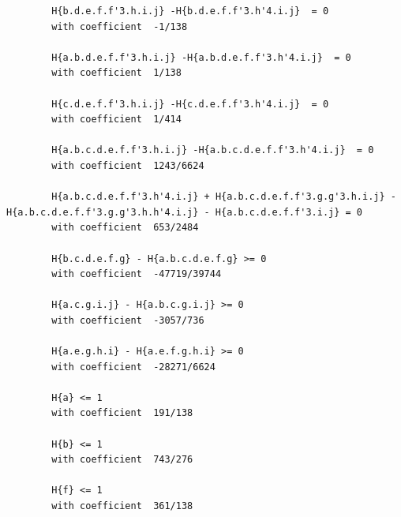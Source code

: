 \documentclass[11pt, a4paper]{kybernetika}
\begin{document}
\begin{verbatim}
		H{b.d.e.f.f'3.h.i.j} -H{b.d.e.f.f'3.h'4.i.j}  = 0
		with coefficient  -1/138
		
		H{a.b.d.e.f.f'3.h.i.j} -H{a.b.d.e.f.f'3.h'4.i.j}  = 0
		with coefficient  1/138
		
		H{c.d.e.f.f'3.h.i.j} -H{c.d.e.f.f'3.h'4.i.j}  = 0
		with coefficient  1/414
		
		H{a.b.c.d.e.f.f'3.h.i.j} -H{a.b.c.d.e.f.f'3.h'4.i.j}  = 0
		with coefficient  1243/6624
		
		H{a.b.c.d.e.f.f'3.h'4.i.j} + H{a.b.c.d.e.f.f'3.g.g'3.h.i.j} - H{a.b.c.d.e.f.f'3.g.g'3.h.h'4.i.j} - H{a.b.c.d.e.f.f'3.i.j} = 0
		with coefficient  653/2484
		
		H{b.c.d.e.f.g} - H{a.b.c.d.e.f.g} >= 0 
		with coefficient  -47719/39744
		
		H{a.c.g.i.j} - H{a.b.c.g.i.j} >= 0 
		with coefficient  -3057/736
		
		H{a.e.g.h.i} - H{a.e.f.g.h.i} >= 0 
		with coefficient  -28271/6624
		
		H{a} <= 1 
		with coefficient  191/138
		
		H{b} <= 1 
		with coefficient  743/276
		
		H{f} <= 1 
		with coefficient  361/138
		
	\end{verbatim}
\end{document}
